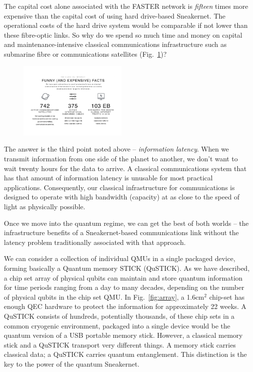 \documentclass[twocolumn, aps, rmp, amsmath, amssymb, nofootinbib, superscriptaddress, longbibliography, floatfix, table-of-contents, eqsecnum]{revtex4-2}
\begin{document}
The capital cost alone associated with the FASTER network is \textit{fifteen} times more expensive than the capital cost of using hard drive-based Sneakernet. The operational costs of the hard drive system would be comparable if not lower than these fibre-optic links. So why do we spend so much time and money on capital and maintenance-intensive classical communications infrastructure such as submarine fibre or communications satellites (Fig.~\ref{fig:classical})?

\begin{figure}[htbp!]
	\includegraphics[clip=true, width=0.475\textwidth]{classical}
	\caption{} \label{fig:classical}
\end{figure}

The answer is the third point noted above -- \textit{information latency}. When we transmit information from one side of the planet to another, we don't want to wait twenty hours for the data to arrive. A classical communications system that has that amount of information latency is unusable for most practical applications. Consequently, our classical infrastructure for communications is designed to operate with high bandwidth (capacity) at as close to the speed of light as physically possible. 

Once we move into the quantum regime, we can get the best of both worlds -- the infrastructure benefits of a Sneakernet-based communications link without the latency problem traditionally associated with that approach. 

We can consider a collection of individual QMUs in a single packaged device, forming basically a Quantum memory STICK (QuSTICK). As we have described, a chip set array of physical qubits can maintain and store quantum information for time periods ranging from a day to many decades, depending on the number of physical qubits in the chip set QMU. In Fig.~\ref{fig:array}, a 1.6cm$^2$ chip-set has enough QEC hardware to protect the information for approximately 22 weeks. A QuSTICK consists of hundreds, potentially thousands, of these chip sets in a common cryogenic environment, packaged into a single device would be the quantum version of a USB portable memory stick. However, a classical memory stick and a QuSTICK transport very different things. A memory stick carries classical data; a QuSTICK carries quantum entanglement. This distinction is the key to the power of the quantum Sneakernet. 
\end{document}
